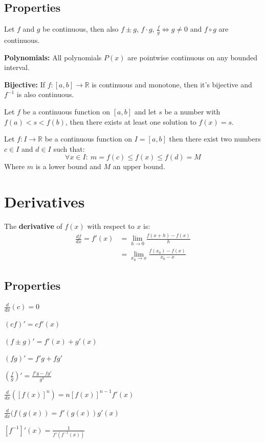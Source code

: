 \documentclass[8pt,a4paper]{extarticle}     %
\theoremstyle{definition}
\theoremstyle{definition}
\theoremstyle{definition}
\newcommand{\R}{\mathbb{R}}
\begin{document}
\begin{multicols}{4}
\subsection{Properties}
Let $f$ and $g$ be continuous, then also $f\pm g$, $f \cdot g$, $\frac{f}{g} \Leftrightarrow g\neq 0$ and $f \circ g$ are continuous. 
\begin{eqlist}
	\item \textbf{Polynomials:} All polynomials $P(x)$ are pointwise continuous on any bounded interval.
	\item \textbf{Bijective: } If $f:[a,b]\rightarrow\R$ is continuous and monotone, then it's bijective and $f^{-1}$ is also continuous.
\end{eqlist}

\begin{boxtheorem}
	Let $f$ be a continuous function on $[a,b]$ and let $s$ be a number with $f(a) < s < f(b)$, then there exists at least one solution to $f(x) = s$.
\end{boxtheorem}
\begin{boxtheorem}
	Let $f:I\rightarrow \R$ be a continuous function on $I=[a,b]$ then there exist two numbers $c \in I$ and $d \in I$ such that:
	$$\forall x \in I: \ m = f(c) \leq f(x) \leq f(d) = M$$
	Where $m$ is a lower bound and $M$ an upper bound.
\end{boxtheorem}

\vfill\eject
\columnbreak
\section{Derivatives}
\begin{boxdefinition}[Derivative]
	The \textbf{derivative} of $f(x)$ with respect to $x$ is: \\
	\[
	\begin{split}
		\displaystyle\frac{df}{dx} = f'(x) &= \lim_{h \to 0}\frac{f(x+h)-f(x)}{h}\\ 
		&=\lim_{x_0 \to x} \frac{f(x_0)-f(x)}{x_0-x}
	\end{split}
	\]
\end{boxdefinition}
\subsection{Properties}
\begin{eqlist}
	\item $\frac{d}{dx}(c) = 0$
	\item $(cf)' = cf'(x)$
	\item $(f\pm g)'= f'(x) + g'(x)$
	\item $(fg)' = f'g + fg'$
	\item $\left(\frac{f}{g}\right)' = \frac{f'g-fg'}{g^2}$
	\item $\frac{d}{dx}\left([f(x)]^n\right) = n[f(x)]^{n-1}f'(x)$
	\item $\frac{d}{dx}(f(g(x)) = f'(g(x))g'(x)$
	\item $[f^{-1}]'(x) = \frac{1}{f'(f^{-1}(x))}$
\end{eqlist}

\end{multicols}
\end{document}
